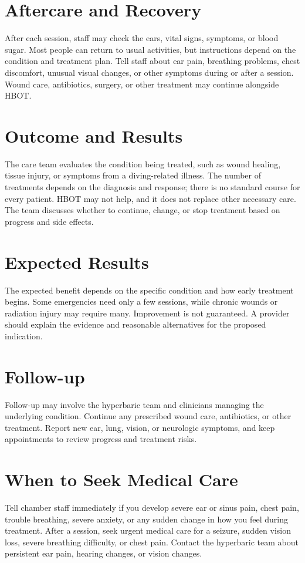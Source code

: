 \section*{Aftercare and Recovery}
After each session, staff may check the ears, vital signs, symptoms, or blood sugar. Most people can return to usual activities, but instructions depend on the condition and treatment plan. Tell staff about ear pain, breathing problems, chest discomfort, unusual visual changes, or other symptoms during or after a session. Wound care, antibiotics, surgery, or other treatment may continue alongside HBOT.

\section*{Outcome and Results}
The care team evaluates the condition being treated, such as wound healing, tissue injury, or symptoms from a diving-related illness. The number of treatments depends on the diagnosis and response; there is no standard course for every patient. HBOT may not help, and it does not replace other necessary care. The team discusses whether to continue, change, or stop treatment based on progress and side effects.

\section*{Expected Results}
The expected benefit depends on the specific condition and how early treatment begins. Some emergencies need only a few sessions, while chronic wounds or radiation injury may require many. Improvement is not guaranteed. A provider should explain the evidence and reasonable alternatives for the proposed indication.

\section*{Follow-up}
Follow-up may involve the hyperbaric team and clinicians managing the underlying condition. Continue any prescribed wound care, antibiotics, or other treatment. Report new ear, lung, vision, or neurologic symptoms, and keep appointments to review progress and treatment risks.

\section*{When to Seek Medical Care}
Tell chamber staff immediately if you develop severe ear or sinus pain, chest pain, trouble breathing, severe anxiety, or any sudden change in how you feel during treatment. After a session, seek urgent medical care for a seizure, sudden vision loss, severe breathing difficulty, or chest pain. Contact the hyperbaric team about persistent ear pain, hearing changes, or vision changes.

